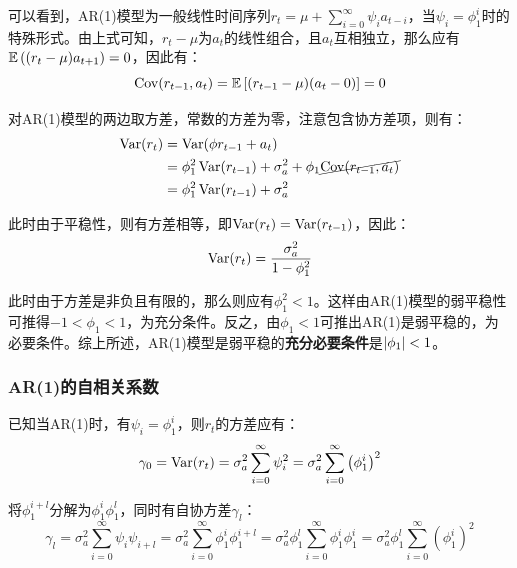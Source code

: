 \documentclass[11pt]{article}
\begin{document}
可以看到，AR(1)模型为一般线性时间序列$r_t = \mu + \sum_{i=0}^{\infty} \psi_i a_{t-i}$，当$\psi_i = \phi_{1}^{i}$时的特殊形式。由上式可知，$r_t-\mu$为$a_t$的线性组合，且$a_t$互相独立，那么应有$\mathbb{E}\left((r_{t}-\mu)a_{t+1}\right)=0$，因此有：
\begin{equation*}
    \operatorname{Cov}(r_{t-1},a_t) = \mathbb{E}\left[(r_{t-1} - \mu)(a_{t} - 0) \right] = 0
\end{equation*}

对AR(1)模型的两边取方差，常数的方差为零，注意包含协方差项，则有：
\begin{align*}
    \operatorname{Var}(r_t) &= \operatorname{Var}(\phi r_{t-1} + a_t) \\
    &= \phi_{1}^{2} \operatorname{Var}(r_{t-1}) + \sigma_{a}^{2} + \phi_1 \cancel{\operatorname{Cov} (r_{t-1},a_t)} \\
    &= \phi_{1}^{2} \operatorname{Var}(r_{t-1}) + \sigma_{a}^{2}
\end{align*}

此时由于平稳性，则有方差相等，即$\operatorname{Var}(r_{t}) = \operatorname{Var}(r_{t-1})$，因此：
\begin{equation*}
    \operatorname{Var}(r_{t}) = \frac{\sigma_{a}^{2}}{1-\phi_{1}^{2}}
\end{equation*}

此时由于方差是非负且有限的，那么则应有$\phi_{1}^{2}<1$。这样由AR(1)模型的弱平稳性可推得$-1<\phi_1<1$，为充分条件。反之，由$\phi_1<1$可推出AR(1)是弱平稳的，为必要条件。综上所述，AR(1)模型是弱平稳的\textbf{充分必要条件}是$\left\lvert \phi_1\right\rvert<1$。

\subsubsection*{AR(1)的自相关系数}

已知当AR(1)时，有$\psi_i = \phi_1^i$，则$r_t$的方差应有：
\begin{equation*}
    \gamma_0 = \operatorname{Var}(r_t) = \sigma_{a}^{2}\sum_{i=0}^{\infty} \psi_{i}^{2}
    = \sigma_{a}^{2}\sum_{i=0}^{\infty} \left( \phi_1^{i}\right)^{2}
\end{equation*}

将$\phi_1^{i+l}$分解为$\phi_1^{i}\phi_1^{l}$，同时有自协方差$\gamma_l$：
\begin{equation*}
    \gamma_l = \sigma_{a}^{2} \sum_{i=0}^{\infty} \psi_i \psi_{i+l} 
    = \sigma_{a}^{2} \sum_{i=0}^{\infty} \phi_1^i \phi_1^{i+l} 
    = \sigma_{a}^{2} \phi_1^{l} \sum_{i=0}^{\infty} \phi_1^i \phi_1^{i} 
    = \sigma_{a}^{2} \phi_1^{l} \sum_{i=0}^{\infty} \left( \phi_1^i \right)^2
\end{equation*}
\end{document}
